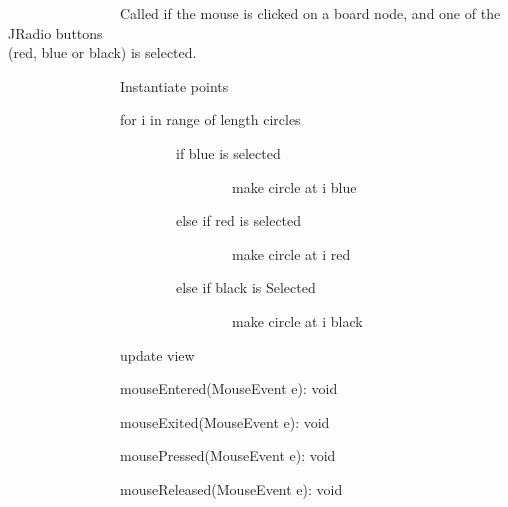 \documentclass{article}
\begin{document}
{{~~~~~~~~~~~~~~~~Called if the mouse is clicked on a board node, and one
of the JRadio buttons\\
\hspace*{0.333em}\hspace*{0.333em}\hspace*{0.333em}\hspace*{0.333em}\hspace*{0.333em}\hspace*{0.333em}\hspace*{0.333em}\hspace*{0.333em}\hspace*{0.333em}\hspace*{0.333em}\hspace*{0.333em}\hspace*{0.333em}\hspace*{0.333em}\hspace*{0.333em}\hspace*{0.333em}\hspace*{0.333em}(red,
blue or black) is selected. }{~~~~~~~~~~~~~~~~}

{~~~~~~~~~~~~~~~~}{Instantiate points}

{~~~~~~~~~~~~~~~~for i in range of length circles}

{~~~~~~~~~~~~~~~~~~~~~~~~if blue is selected}

{~~~~~~~~~~~~~~~~~~~~~~~~~~~~~~~~make circle at i blue}

{~~~~~~~~~~~~~~~~~~~~~~~~else if red is selected}

{~~~~~~~~~~~~~~~~~~~~~~~~~~~~~~~~make circle at i red}

{~~~~~~~~~~~~~~~~~~~~~~~~else if black is Selected}

{~~~~~~~~~~~~~~~~~~~~~~~~~~~~~~~~make circle at i black}

{~~~~~~~~~~~~~~~~update view}

{}

{}

{}

{~~~~~~~~~~~~~~~~mouseEntered(MouseEvent e): void}

{~~~~~~~~~~~~~~~~mouseExited(MouseEvent e): void}

{~~~~~~~~~~~~~~~~mousePressed(MouseEvent e): void}

{~~~~~~~~~~~~~~~~mouseReleased(MouseEvent e): void}

{~~~~~~~~~~~~~~~~}

{~~~~~~~~}

{~~~~~~~~~~~~~~~~}

}
\end{document}
